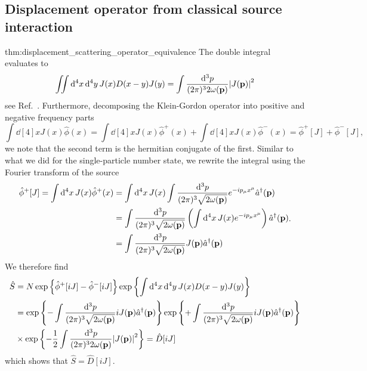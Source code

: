 \subsection{Displacement operator from classical source interaction}

\begin{delayedproof}{thm:displacement_scattering_operator_equivalence}
	The double integral evaluates to
	\begin{equation}
		\iint\dd[4]{x}\dd[4]{y}
		J(x)
		D(x-y)
		J(y)
		=
		\int\frac{\dd[3]{p}}{(2\pi)^32\omega(\vb{p})}
		\abs{J(\vb{p})}^2
	\end{equation}
	see Ref.~\cite[p.~26]{Zee2010}.
	Furthermore, decomposing the Klein-Gordon operator into positive and negative frequency parts
	\begin{equation}
		\int\dd[4]{x}
		J(x)
		\hat\phi(x)
		=
		\int\dd[4]{x}
		J(x)
		\hat\phi^+(x)
		+
		\int\dd[4]{x}
		J(x)
		\hat\phi^-(x)
		=
		\hat\phi^+[J]
		+
		\hat\phi^-[J]
		,
	\end{equation}
	we note that the second term is the hermitian conjugate of the first.
	Similar to what we did for the single-particle number state, we rewrite the integral using the Fourier transform of the source
	\begin{equation}
		\begin{split}
			\hat\phi^+[J]
			=
			\int\dd[4]{x}
			J(x)
			\hat\phi^+(x)
			&=
			\int\dd[4]{x}
			J(x)
			\int\frac{\dd[3]{p}}{(2\pi)^3\sqrt{2\omega(\vb{p})}}
			e^{-ip_\mu x^\mu}
			\hat{a}^\dagger(\vb{p})
			\\
			&=
			\int\frac{\dd[3]{p}}{(2\pi)^3\sqrt{2\omega(\vb{p})}}
			\left(
				\int\dd[4]{x}
				J(x)
				e^{-ip_\mu x^\mu}
			\right)
			\hat{a}^\dagger(\vb{p})
			\\
			&=
			\int\frac{\dd[3]{p}}{(2\pi)^3\sqrt{2\omega(\vb{p})}}
			J(\vb{p})
			\hat{a}^\dagger(\vb{p})
		\end{split}
		.
	\end{equation}
	We therefore find
	\begin{equation}
		\begin{split}
			\hat{S}
			&=
			N\exp\left\{
				\hat\phi^+[iJ]
				-
				\hat\phi^-[iJ]
			\right\}
			\exp\left\{
				\int\dd[4]{x}\dd[4]{y}
				J(x)
				D(x-y)
				J(y)
			\right\}
			\\
			&=
			\exp\left\{
				-
				\int\frac{\dd[3]{p}}{(2\pi)^3\sqrt{2\omega(\vb{p})}}
				iJ(\vb{p})
				\hat{a}^\dagger(\vb{p})
			\right\}
			\exp\left\{
				+
				\int\frac{\dd[3]{p}}{(2\pi)^3\sqrt{2\omega(\vb{p})}}
				iJ(\vb{p})
				\hat{a}^\dagger(\vb{p})
			\right\}
			\\
			&\times
			\exp\left\{
				-
				\frac{1}{2}
				\int\frac{\dd[3]{p}}{(2\pi)^32\omega(\vb{p})}
				\abs{J(\vb{p})}^2
			\right\}
			=
			\hat{D}[iJ]
		\end{split}
	\end{equation}
	which shows that $\hat{S}=\hat{D}[iJ]$.
\end{delayedproof}


